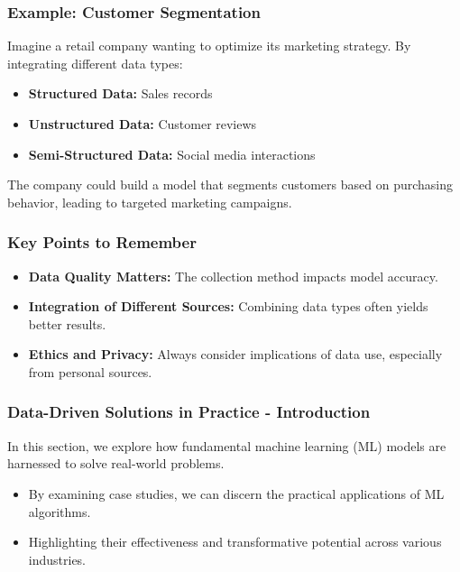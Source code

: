 \documentclass[aspectratio=169]{beamer}
\begin{document}
\begin{frame}[fragile]
    \frametitle{Example: Customer Segmentation}
    Imagine a retail company wanting to optimize its marketing strategy. By integrating different data types:
    
    \begin{itemize}
        \item \textbf{Structured Data:} Sales records
        \item \textbf{Unstructured Data:} Customer reviews
        \item \textbf{Semi-Structured Data:} Social media interactions
    \end{itemize}

    The company could build a model that segments customers based on purchasing behavior, leading to targeted marketing campaigns.
\end{frame}

\begin{frame}[fragile]
    \frametitle{Key Points to Remember}
    \begin{itemize}
        \item \textbf{Data Quality Matters:} The collection method impacts model accuracy.
        \item \textbf{Integration of Different Sources:} Combining data types often yields better results.
        \item \textbf{Ethics and Privacy:} Always consider implications of data use, especially from personal sources.
    \end{itemize}
\end{frame}

\begin{frame}[fragile]
    \frametitle{Data-Driven Solutions in Practice - Introduction}
    In this section, we explore how fundamental machine learning (ML) models are harnessed to solve real-world problems. 
    \begin{itemize}
        \item By examining case studies, we can discern the practical applications of ML algorithms.
        \item Highlighting their effectiveness and transformative potential across various industries.
    \end{itemize}
\end{frame}
\end{document}

